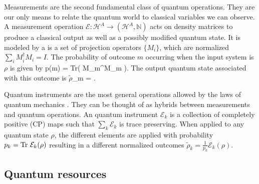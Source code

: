 \documentclass[aps,11pt,twoside,letterpaper]{article}
\def \Tr{\textup{Tr}}
\def\E{\mathcal{E}}
\def\cH{\mathcal{H}}
\def\NN{\mathbb{N}}
\newcommand{\rhot}{{\ensuremath{\tilde{\rho}}}}
\theoremstyle{plain}
\theoremstyle{definition}
\begin{document}

				
			Measurements are the second fundamental class of quantum operations. 
			They are our only means to relate the quantum world to classical variables we can observe.
			A measurement operation $\E\!\!:\!\!\cH^A \to (\cH^A,\NN)$ acts on density matrices to produce a classical
			output as well as a possibly modified quantum state.
			It is modeled by a is a set of projection operators $\{M_i\}$, which are normalized 
			$\sum_i M_i^\dag M_i = I$.
			The probability of outcome $m$ occurring when the input system is $\rho$ is given by
			\be
				p(m)	=	\Tr\!\left( M_m^\dag \rho M_m \right).
			\ee
			The output quantum state associated with this outcome is
			\be
				 \rhot_m	=  \frac{M_m^\dag \rho M_m}{	\Tr\!\left( M_m^\dag \rho M_m \right)	}.
			\ee

			Quantum instruments are the most general operations allowed by the laws of quantum mechanics \cite{DL70}.
			They can be thought of as hybrids between measurements and quantum operations.
			An quantum instrument $\E_k$ is a collection of completely positive (CP) maps such that $\sum_k\!\E_k$ is 
			trace preserving. When applied to any quantum state $\rho$, the different elements are applied
			with probability $p_k = \Tr\ \E_k(\rho)$ resulting in a different normalized outcomes 
			$\rhot_k=\frac{1}{p_k}\E_k(\rho)$.
	
			


		\bigskip
		\subsection{Quantum resources}	\label{subsection:quantum-resources}
		
\end{document}
